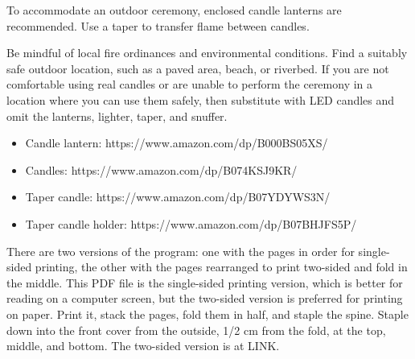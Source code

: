 \documentclass{article}
\begin{document}
To accommodate an outdoor ceremony, enclosed candle lanterns are recommended.
Use a taper to transfer flame between candles.

Be mindful of local fire ordinances and environmental conditions. Find a
suitably safe outdoor location, such as a paved area, beach, or riverbed.
If you are not comfortable using real candles or are unable to perform the
ceremony in a location where you can use them safely, then substitute with LED
candles and omit the lanterns, lighter, taper, and snuffer.

\begin{itemize} \itemsep0pt \parskip0pt 
	\item Candle lantern: https://www.amazon.com/dp/B000BS05XS/
	\item Candles: https://www.amazon.com/dp/B074KSJ9KR/
	\item Taper candle: https://www.amazon.com/dp/B07YDYWS3N/
	\item Taper candle holder: https://www.amazon.com/dp/B07BHJFS5P/
\end{itemize}

There are two versions of the program: one with the pages in order for
single-sided printing, the other with the pages rearranged to print two-sided
and fold in the middle. This PDF file is the single-sided printing version,
which is better for reading on a computer screen, but the two-sided version is
preferred for printing on paper. Print it, stack the pages, fold them in half,
and staple the spine. Staple down into the front cover from the outside, 1/2
cm from the fold, at the top, middle, and bottom. The two-sided version is at
LINK{}. %
\end{document}
